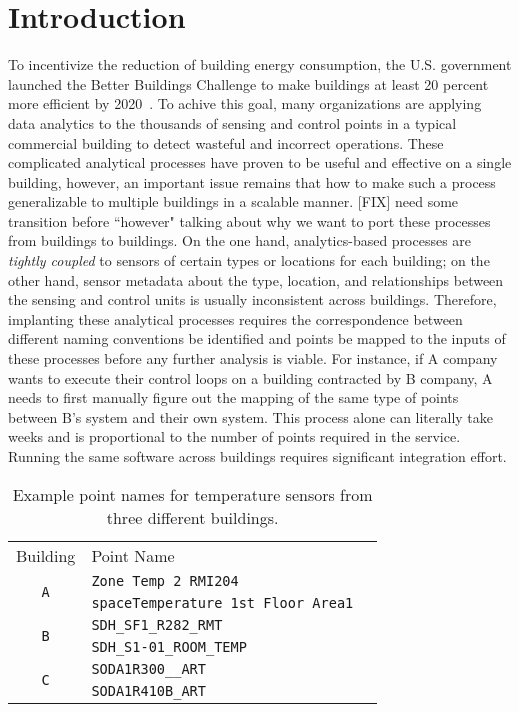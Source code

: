\section{Introduction}

To incentivize the reduction of building energy consumption, the U.S. government 
launched the Better Buildings Challenge to make buildings at least 20 percent 
more efficient by 2020~\cite{doe2013better}. To achive this goal, many organizations 
are applying data analytics to the thousands of sensing and control points in 
a typical commercial building to detect wasteful and incorrect operations. These 
complicated analytical processes have proven to be useful and effective on 
a single building, however, an important issue remains that how to make such a process 
generalizable to multiple buildings in a scalable manner. [FIX] need some transition 
before ``however" talking about why we want to port these processes from buildings 
to buildings. On the one hand, analytics-based processes are \emph{tightly coupled} 
to sensors of certain types or locations for each building; on the other hand, 
sensor metadata about the type, location, and relationships between the sensing 
and control units is usually inconsistent across buildings. Therefore, implanting 
these analytical processes requires the correspondence between different naming 
conventions be identified and points be mapped to the inputs of these processes 
before any further analysis is viable. For instance, if A company wants to execute their 
control loops on a building contracted by B company, A needs to first manually 
figure out the mapping of the same type of points between B's system and 
their own system. This process alone can literally take weeks and is proportional 
to the number of points required in the service. Running the same software across 
buildings requires significant integration effort.


\begin{table}[h]
\centering
\begin{tabular}{c|ll}
\cline{1-2}
Building & Point Name & \\
\cline{1-2}
\multirow{2}{*}{\texttt{A}}  & \texttt{Zone Temp 2 RMI204} &  \\
					& \texttt{spaceTemperature 1st Floor Area1} &  \\ \cline{1-2}
\multirow{2}{*}{\texttt{B}} & \texttt{SDH\_SF1\_R282\_RMT} &  \\
                     & \texttt{SDH\_S1-01\_ROOM\_TEMP} &  \\ \cline{1-2}
\multirow{2}{*}{\texttt{C}}  & \texttt{SODA1R300\_\_ART} &  \\
					  & \texttt{SODA1R410B\_ART} &  \\ \cline{1-2}
\end{tabular}
\caption{Example point names for temperature sensors from three different buildings.}
\label{table:ex}
\end{table}


